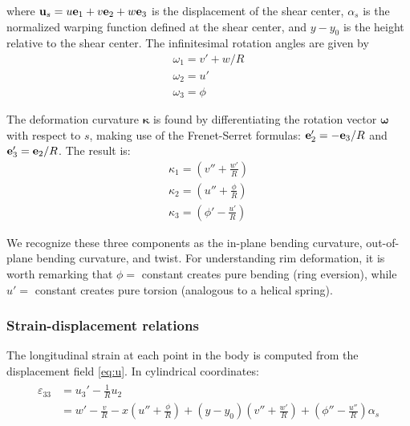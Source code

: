 \documentclass[\rootdir/thesis.tex]{subfiles}
\begin{document}
where $\mathbf{u}_s = u\mathbf{e}_1 + v\mathbf{e}_2 + w\mathbf{e}_3$ is the displacement of the shear center, $\alpha_s$ is the normalized warping function defined at the shear center, and $y-y_0$ is the height relative to the shear center. The infinitesimal rotation angles are given by
\begin{subequations}
\label{eq:omega}
\begin{align}
\omega_1 = v' + w/R\\
\omega_2 = u'\\
\omega_3 = \phi
\end{align}
\end{subequations}

The deformation curvature $\mathbf{\kappa}$ is found by differentiating the rotation vector $\mathbf{\omega}$ with respect to $s$, making use of the Frenet-Serret formulas: $\mathbf{e}_2' = -\mathbf{e}_3/R$ and $\mathbf{e}_3' = \mathbf{e}_2/R$. The result is:
\begin{subequations}
\label{eq:kappa}
\begin{align}
\kappa_1 = \left( v'' + \frac{w'}{R} \right) \label{eq:kappa1}\\
\kappa_2 = \left( u'' + \frac{\phi}{R} \right) \label{eq:kappa2}\\
\kappa_3 = \left( \phi' - \frac{u'}{R} \right) \label{eq:kappa3}
\end{align}
\end{subequations}

We recognize these three components as the in-plane bending curvature, out-of-plane bending curvature, and twist. For understanding rim deformation, it is worth remarking that $\phi=$ constant creates pure bending (ring eversion), while $u'=$ constant creates pure torsion (analogous to a helical spring).

\subsubsection{Strain-displacement relations}

The longitudinal strain at each point in the body is computed from the displacement field \eqref{eq:u}. In cylindrical coordinates:
\begin{align}
\label{eq:strain}
\begin{split}
\varepsilon_{33} &= u_3' - \frac{1}{R} u_2\\
                 &= w' - \frac{v}{R} - x\left(u'' + \frac{\phi}{R}\right) +
                 	(y-y_0)\left(v'' + \frac{w'}{R}\right) +
                 	\left(\phi'' - \frac{u''}{R}\right)\alpha_s
\end{split}
\end{align}
\end{document}
